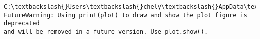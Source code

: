 \documentclass[11pt]{article}
\begin{document}
    \begin{Verbatim}[commandchars=\\\{\}]
C:\textbackslash{}Users\textbackslash{}chely\textbackslash{}AppData\textbackslash{}Local\textbackslash{}Temp\textbackslash{}ipykernel\_20580\textbackslash{}2111622971.py:21:
FutureWarning: Using print(plot) to draw and show the plot figure is deprecated
and will be removed in a future version. Use plot.show().
    \end{Verbatim}

    \begin{center}
    \end{center}
    { \hspace*{\fill} \\}
    
    \begin{Verbatim}[commandchars=\\\{\}]

    \end{Verbatim}
\end{document}
